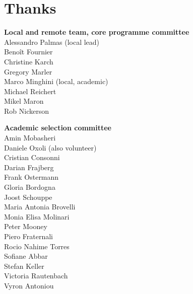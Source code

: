 \newpage
\section*{Thanks}
\label{thanks}
\pagestyle{cropmarksstyle}
\vspace{-1\baselineskip}

\enlargethispage{1\baselineskip}
\newlength{\volunteerSpace}
\setlength{}
\RaggedRight
\begin{multicols}{2}
  \begin{small}
    \textbf{Local and remote team, core programme committee}\\
    Alessandro Palmas (local lead)\\
    Benoît Fournier\\
    Christine Karch\\
    Gregory Marler\\
    Marco Minghini (local, academic)\\
    Michael Reichert\\
    Mikel Maron\\
    Rob Nickerson

    \vspace{\volunteerSpace}
    \textbf{Academic selection committee}\\
    Amin Mobasheri\\
    Daniele Oxoli (also volunteer)\\
    Cristian Consonni\\
    Darian Frajberg\\
    Frank Ostermann\\
    Gloria Bordogna\\
    Joost Schouppe\\
    Maria Antonia Brovelli\\
    Monia Elisa Molinari\\
    Peter Mooney\\
    Piero Fraternali\\
    Rocio Nahime Torres\\
    Sofiane Abbar\\
    Stefan Keller\\
    Victoria Rautenbach\\
    Vyron Antoniou


\end{small}
\end{multicols}
